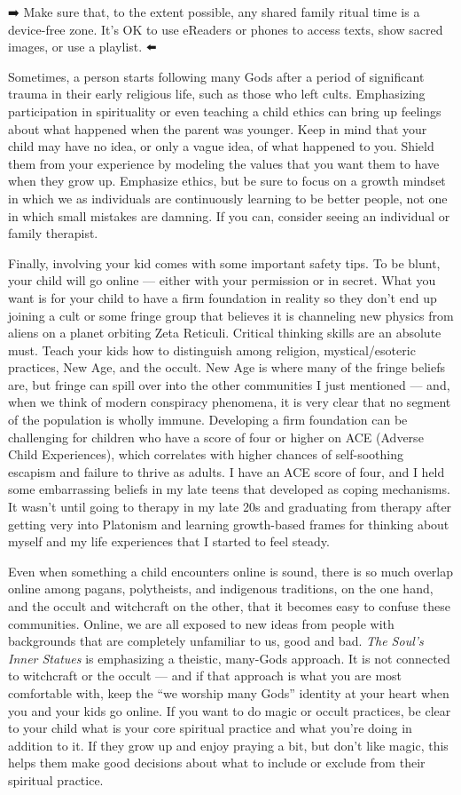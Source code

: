 \documentclass[
]{book}
\begin{document}
➡️ Make sure that, to the extent possible, any shared family ritual time is a device-free zone. It's OK to use eReaders or phones to access texts, show sacred images, or use a playlist. ⬅️

Sometimes, a person starts following many Gods after a period of significant trauma in their early religious life, such as those who left cults. Emphasizing participation in spirituality or even teaching a child ethics can bring up feelings about what happened when the parent was younger. Keep in mind that your child may have no idea, or only a vague idea, of what happened to you. Shield them from your experience by modeling the values that you want them to have when they grow up. Emphasize ethics, but be sure to focus on a growth mindset in which we as individuals are continuously learning to be better people, not one in which small mistakes are damning. If you can, consider seeing an individual or family therapist.

Finally, involving your kid comes with some important safety tips. To be blunt, your child will go online --- either with your permission or in secret. What you want is for your child to have a firm foundation in reality so they don't end up joining a cult or some fringe group that believes it is channeling new physics from aliens on a planet orbiting Zeta Reticuli. Critical thinking skills are an absolute must. Teach your kids how to distinguish among religion, mystical/esoteric practices, New Age, and the occult. New Age is where many of the fringe beliefs are, but fringe can spill over into the other communities I just mentioned --- and, when we think of modern conspiracy phenomena, it is very clear that no segment of the population is wholly immune. Developing a firm foundation can be challenging for children who have a score of four or higher on ACE (Adverse Child Experiences), which correlates with higher chances of self-soothing escapism and failure to thrive as adults. I have an ACE score of four, and I held some embarrassing beliefs in my late teens that developed as coping mechanisms. It wasn't until going to therapy in my late 20s and graduating from therapy after getting very into Platonism and learning growth-based frames for thinking about myself and my life experiences that I started to feel steady.

Even when something a child encounters online is sound, there is so much overlap online among pagans, polytheists, and indigenous traditions, on the one hand, and the occult and witchcraft on the other, that it becomes easy to confuse these communities. Online, we are all exposed to new ideas from people with backgrounds that are completely unfamiliar to us, good and bad. \emph{The Soul's Inner Statues} is emphasizing a theistic, many-Gods approach. It is not connected to witchcraft or the occult --- and if that approach is what you are most comfortable with, keep the ``we worship many Gods'' identity at your heart when you and your kids go online. If you want to do magic or occult practices, be clear to your child what is your core spiritual practice and what you're doing in addition to it. If they grow up and enjoy praying a bit, but don't like magic, this helps them make good decisions about what to include or exclude from their spiritual practice.
\end{document}
